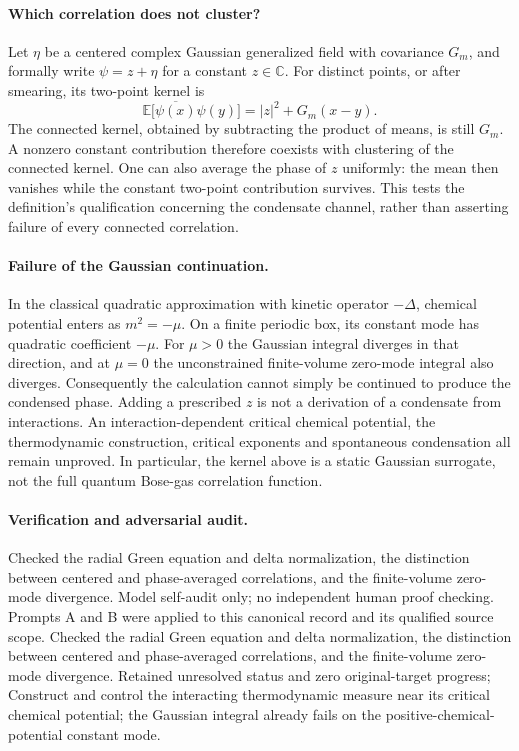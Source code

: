 \documentclass[11pt]{article}
\begin{document}
\paragraph{Which correlation does not cluster?}
Let $\eta$ be a centered complex Gaussian generalized field with covariance $G_m$, and formally write $\psi=z+\eta$ for a constant $z\in\mathbb C$. For distinct points, or after smearing, its two-point kernel is
\[
 \mathbb E\bigl[\overline{\psi(x)}\psi(y)\bigr]
   =|z|^2+G_m(x-y).
\]
The connected kernel, obtained by subtracting the product of means, is still $G_m$. A nonzero constant contribution therefore coexists with clustering of the connected kernel. One can also average the phase of $z$ uniformly: the mean then vanishes while the constant two-point contribution survives. This tests the definition's qualification concerning the condensate channel, rather than asserting failure of every connected correlation.

\paragraph{Failure of the Gaussian continuation.}
In the classical quadratic approximation with kinetic operator $-\Delta$, chemical potential enters as $m^2=-\mu$. On a finite periodic box, its constant mode has quadratic coefficient $-\mu$. For $\mu>0$ the Gaussian integral diverges in that direction, and at $\mu=0$ the unconstrained finite-volume zero-mode integral also diverges. Consequently the calculation cannot simply be continued to produce the condensed phase. Adding a prescribed $z$ is not a derivation of a condensate from interactions. An interaction-dependent critical chemical potential, the thermodynamic construction, critical exponents and spontaneous condensation all remain unproved. In particular, the kernel above is a static Gaussian surrogate, not the full quantum Bose-gas correlation function.

\paragraph{Verification and adversarial audit.}
Checked the radial Green equation and delta normalization, the distinction between centered and phase-averaged correlations, and the finite-volume zero-mode divergence. Model self-audit only; no independent human proof checking. Prompts A and B were applied to this canonical record and its qualified source scope. Checked the radial Green equation and delta normalization, the distinction between centered and phase-averaged correlations, and the finite-volume zero-mode divergence. Retained unresolved status and zero original-target progress; Construct and control the interacting thermodynamic measure near its critical chemical potential; the Gaussian integral already fails on the positive-chemical-potential constant mode.
\end{document}
